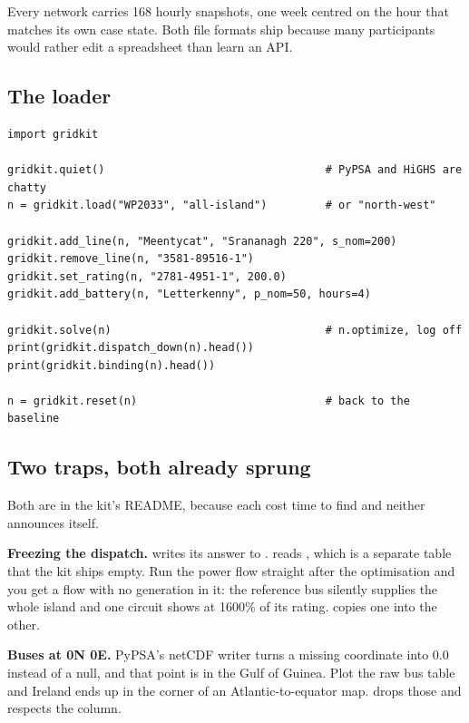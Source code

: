 \documentclass[11pt,a4paper]{article}
\begin{document}
Every network carries 168 hourly snapshots, one week centred on the hour that
matches its own case state. Both file formats ship because many participants
would rather edit a spreadsheet than learn an API.

\subsection{The loader}

\begin{lstlisting}
import gridkit

gridkit.quiet()                                  # PyPSA and HiGHS are chatty
n = gridkit.load("WP2033", "all-island")         # or "north-west"

gridkit.add_line(n, "Meentycat", "Srananagh 220", s_nom=200)
gridkit.remove_line(n, "3581-89516-1")
gridkit.set_rating(n, "2781-4951-1", 200.0)
gridkit.add_battery(n, "Letterkenny", p_nom=50, hours=4)

gridkit.solve(n)                                 # n.optimize, log off
print(gridkit.dispatch_down(n).head())
print(gridkit.binding(n).head())

n = gridkit.reset(n)                             # back to the baseline
\end{lstlisting}


\subsection{Two traps, both already sprung}

Both are in the kit's README, because each cost time to find and neither
announces itself.

\textbf{Freezing the dispatch.}  writes its answer to
.  reads , which
is a separate table that the kit ships empty. Run the power flow straight after
the optimisation and you get a flow with no generation in it: the reference bus
silently supplies the whole island and one circuit shows at 1600\% of its
rating.  copies one into the other.

\textbf{Buses at 0\textdegree{}N 0\textdegree{}E.} PyPSA's netCDF writer turns
a missing coordinate into 0.0 instead of a null, and that point is in the Gulf
of Guinea. Plot the raw bus table and Ireland ends up in the corner of an
Atlantic-to-equator map.  drops those and
respects the  column.
\end{document}

